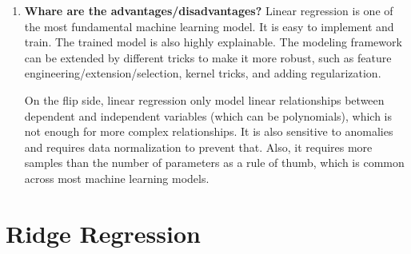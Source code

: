 \documentclass{article}
\begin{document}
\begin{enumerate}
    \item \textbf{Whare are the advantages/disadvantages?}
    \noindent 
    \smallbreak
    Linear regression is one of the most fundamental machine learning model. It is easy to implement and train. The trained model is also highly explainable. The modeling framework can be extended by different tricks to make it more robust, such as feature engineering/extension/selection, kernel tricks, and adding regularization.
    
    On the flip side, linear regression only model linear relationships between dependent and independent variables (which can be polynomials), which is not enough for more complex relationships. It is also sensitive to anomalies and requires data normalization to prevent that. Also, it requires more samples than the number of parameters as a rule of thumb, which is common across most machine learning models.
    
\end{enumerate}

\section{Ridge Regression}
\end{document}
